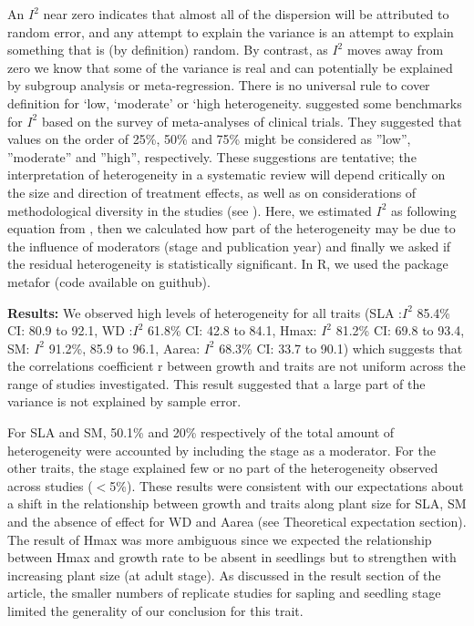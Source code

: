 \documentclass[a4paper,11pt]{article}
\begin{document}
\begin{appendices}
An $I^{2}$ near zero indicates that almost all of the dispersion will be attributed to random error, and any attempt to explain the variance is an attempt to explain something that is (by definition) random. By contrast, as $I^{2}$ moves away from zero we know that some of the variance is real and can potentially be explained by subgroup analysis or meta-regression.
There is no universal rule to cover definition for ‘low, ‘moderate’ or ‘high heterogeneity. \citealt{Higgins:2003hz} suggested some benchmarks for $I^{2}$ based on the survey of meta-analyses of clinical trials. They suggested that values on the order of 25\%, 50\% and 75\% might be considered as ''low'', ''moderate'' and ''high'', respectively. These suggestions are tentative; the interpretation of heterogeneity in a systematic review will depend critically on the size and direction of treatment effects, as well as on considerations of methodological diversity in the studies (see \citealt{Borenstein:2009um}).
Here, we estimated $I^{2}$ as following equation from \citealt{Higgins:2002iq}, then we calculated how part of the heterogeneity may be due to the influence of moderators (stage and publication year) and finally we asked if the residual heterogeneity is statistically significant. In R, we used the package metafor (code available on guithub).


\textbf{Results:} We observed high levels of heterogeneity for all traits (SLA :$I^{2}$ 85.4\% CI: 80.9 to 92.1, WD :$I^{2}$ 61.8\% CI: 42.8 to 84.1, Hmax: $I^{2}$ 81.2\% CI: 69.8 to 93.4, SM: $I^{2}$ 91.2\%, 85.9 to 96.1, Aarea: $I^{2}$ 68.3\% CI: 33.7 to 90.1) which suggests that the correlations coefficient r between growth and traits are not uniform across the range of studies investigated. This result suggested that a large part of the variance is not explained by sample error.

For SLA and SM, 50.1\% and 20\% respectively of the total amount of heterogeneity were accounted by including the stage as a moderator. For the other traits, the stage explained few or no part of the heterogeneity observed across studies ($<$5\%). These results were consistent with our expectations about a shift in the relationship between growth and traits along plant size for SLA, SM and the absence of effect for WD and Aarea (see Theoretical expectation section). The result of Hmax was more ambiguous since we expected the relationship between Hmax and growth rate to be absent in seedlings but to strengthen with increasing plant size (at adult stage). As discussed in the result section of the article, the smaller numbers of replicate studies for sapling and seedling stage limited the generality of our conclusion for this trait.


\end{appendices}
\end{document}
